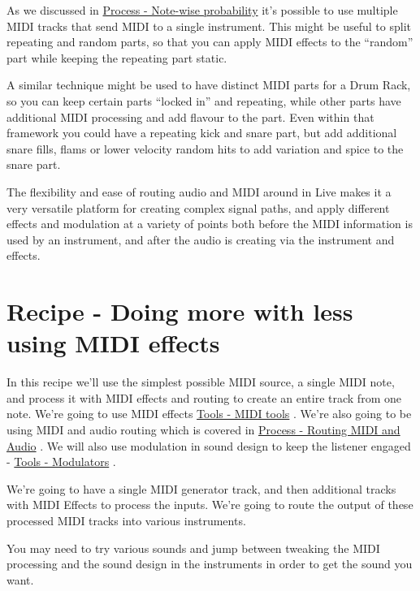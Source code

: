 \documentclass[
  12pt,
  letterpaper,
  oneside,
  open=any]{scrbook}
\begin{document}
As we discussed in
\hyperref[Chapter-002-Process-Note_wise_probability]{Process - Note-wise
probability} it's possible to use multiple MIDI tracks that send MIDI to
a single instrument. This might be useful to split repeating and random
parts, so that you can apply MIDI effects to the ``random'' part while
keeping the repeating part static.

A similar technique might be used to have distinct MIDI parts for a Drum
Rack, so you can keep certain parts ``locked in'' and repeating, while
other parts have additional MIDI processing and add flavour to the part.
Even within that framework you could have a repeating kick and snare
part, but add additional snare fills, flams or lower velocity random
hits to add variation and spice to the snare part.

The flexibility and ease of routing audio and MIDI around in Live makes
it a very versatile platform for creating complex signal paths, and
apply different effects and modulation at a variety of points both
before the MIDI information is used by an instrument, and after the
audio is creating via the instrument and effects.


\chapter{Recipe - Doing more with less using MIDI
effects}\label{Chapter-006-Recipe-MIDI_tools}

\begin{tcolorbox}[enhanced jigsaw, breakable, left=2mm, leftrule=.75mm, toprule=.15mm, opacitybacktitle=0.6, toptitle=1mm, coltitle=black, colback=white, colbacktitle=quarto-callout-tip-color!10!white, opacityback=0, rightrule=.15mm, bottomrule=.15mm, titlerule=0mm, title=\textcolor{quarto-callout-tip-color}{\faLightbulb}\hspace{0.5em}{Key idea}, arc=.35mm, bottomtitle=1mm, colframe=quarto-callout-tip-color-frame]

In this recipe we'll use the simplest possible MIDI source, a single
MIDI note, and process it with MIDI effects and routing to create an
entire track from one note. We're going to use MIDI effects
\hyperref[Chapter-004-Tools-MIDI_tools]{Tools - MIDI tools} . We're also
going to be using MIDI and audio routing which is covered in
\hyperref[Chapter-005-Process-Routing]{Process - Routing MIDI and Audio}
. We will also use modulation in sound design to keep the listener
engaged - \hyperref[Chapter-007-Tools-Modulators]{Tools - Modulators} .

We're going to have a single MIDI generator track, and then additional
tracks with MIDI Effects to process the inputs. We're going to route the
output of these processed MIDI tracks into various instruments.

You may need to try various sounds and jump between tweaking the MIDI
processing and the sound design in the instruments in order to get the
sound you want.

\end{tcolorbox}
\end{document}
